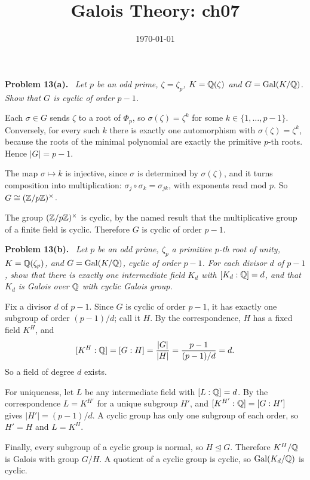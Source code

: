 \documentclass[11pt]{article}
\title{Galois Theory: ch07}
\author{}
\date{\today}
\newenvironment{problem}[1]
  {\par\medskip\noindent\textbf{Problem #1.}\ \itshape}
  {\par\medskip}
\begin{document}
\maketitle


\begin{problem}{13(a)}
Let $p$ be an odd prime, $\zeta=\zeta_p$, $K=\mathbb{Q}(\zeta)$ and $G=\operatorname{Gal}(K/\mathbb{Q})$. Show that $G$ is cyclic of order $p-1$.
\end{problem}
Each $\sigma\in G$ sends $\zeta$ to a root of $\Phi_p$, so $\sigma(\zeta)=\zeta^k$ for some $k\in\{1,\dots,p-1\}$. Conversely, for every such $k$ there is exactly one automorphism with $\sigma(\zeta)=\zeta^k$, because the roots of the minimal polynomial are exactly the primitive $p$-th roots. Hence $|G|=p-1$.

The map $\sigma\mapsto k$ is injective, since $\sigma$ is determined by $\sigma(\zeta)$, and it turns composition into multiplication: $\sigma_j\circ\sigma_k=\sigma_{jk}$, with exponents read mod $p$. So $G\cong(\mathbb{Z}/p\mathbb{Z})^\times$.

The group $(\mathbb{Z}/p\mathbb{Z})^\times$ is cyclic, by the named result that the multiplicative group of a finite field is cyclic. Therefore $G$ is cyclic of order $p-1$.

\begin{problem}{13(b)}
Let $p$ be an odd prime, $\zeta_p$ a primitive $p$-th root of unity, $K=\mathbb{Q}(\zeta_p)$, and $G=\operatorname{Gal}(K/\mathbb{Q})$, cyclic of order $p-1$. For each divisor $d$ of $p-1$, show that there is exactly one intermediate field $K_d$ with $[K_d:\mathbb{Q}]=d$, and that $K_d$ is Galois over $\mathbb{Q}$ with cyclic Galois group.
\end{problem}
Fix a divisor $d$ of $p-1$. Since $G$ is cyclic of order $p-1$, it has exactly one subgroup of order $(p-1)/d$; call it $H$. By the correspondence, $H$ has a fixed field $K^H$, and
\[
[K^H:\mathbb{Q}]=[G:H]=\frac{|G|}{|H|}=\frac{p-1}{(p-1)/d}=d.
\]
So a field of degree $d$ exists.

For uniqueness, let $L$ be any intermediate field with $[L:\mathbb{Q}]=d$. By the correspondence $L=K^{H'}$ for a unique subgroup $H'$, and $[K^{H'}:\mathbb{Q}]=[G:H']$ gives $|H'|=(p-1)/d$. A cyclic group has only one subgroup of each order, so $H'=H$ and $L=K^H$.

Finally, every subgroup of a cyclic group is normal, so $H\unlhd G$. Therefore $K^H/\mathbb{Q}$ is Galois with group $G/H$. A quotient of a cyclic group is cyclic, so $\operatorname{Gal}(K_d/\mathbb{Q})$ is cyclic.
\end{document}
